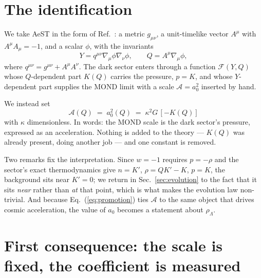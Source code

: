 \documentclass[aps,prd,twocolumn,superscriptaddress,nofootinbib,floatfix]{revtex4-2}
\newcommand{\azero}{a_{0}}
\newcommand{\Acal}{\mathcal{A}}
\newcommand{\Fcal}{\mathcal{F}}
\begin{document}
\section{The identification}

We take AeST in the form of Ref.~\cite{SkordisZlosnik2021}: a metric $g_{\mu\nu}$, a
unit-timelike vector $A^{\mu}$ with $A^{\mu}A_{\mu} = -1$, and a scalar $\phi$, with the
invariants
\begin{equation}
  Y = q^{\mu\nu}\nabla_{\mu}\phi\nabla_{\nu}\phi , \qquad Q = A^{\mu}\nabla_{\mu}\phi ,
\end{equation}
where $q^{\mu\nu} = g^{\mu\nu} + A^{\mu}A^{\nu}$. The dark sector enters through a function
$\Fcal(Y,Q)$ whose $Q$-dependent part $K(Q)$ carries the pressure, $p = K$, and whose
$Y$-dependent part supplies the MOND limit with a scale $\Acal = \azero^{2}$ inserted by hand.

We instead set
\begin{equation}
  \boxed{\;\Acal(Q) \;=\; \azero^{2}(Q) \;=\; \kappa^{2} G\,[-K(Q)]\;}
  \label{eq:promotion}
\end{equation}
with $\kappa$ dimensionless. In words: the MOND scale is the dark sector's pressure, expressed
as an acceleration. Nothing is added to the theory --- $K(Q)$ was already present, doing
another job --- and one constant is removed.

Two remarks fix the interpretation. Since $w = -1$ requires $p = -\rho$ and the sector's exact
thermodynamics give $n = K'$, $\rho = QK' - K$, $p = K$, the background sits near $K' = 0$; we
return in Sec.~\ref{sec:evolution} to the fact that it sits \emph{near} rather than \emph{at}
that point, which is what makes the evolution law non-trivial. And because
Eq.~(\ref{eq:promotion}) ties $\Acal$ to the same object that drives cosmic acceleration, the
value of $\azero$ becomes a statement about $\rho_{\Lambda}$.

\section{First consequence: the scale is fixed, the coefficient is measured}
\end{document}
